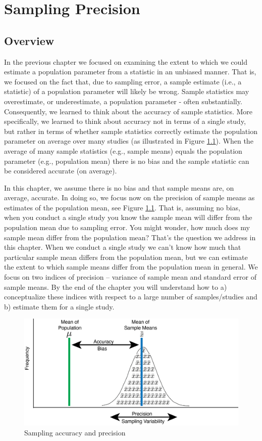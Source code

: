 \documentclass[
]{krantz}
\begin{document}
\hypertarget{sampling-precision}{%
\chapter{Sampling Precision}\label{sampling-precision}}

\hypertarget{overview-2}{%
\section{Overview}\label{overview-2}}

In the previous chapter we focused on examining the extent to which we could estimate a population parameter from a statistic in an unbiased manner. That is, we focused on the fact that, due to sampling error, a sample estimate (i.e., a statistic) of a population parameter will likely be wrong. Sample statistics may overestimate, or underestimate, a population parameter - often substantially. Consequently, we learned to think about the accuracy of sample statistics. More specifically, we learned to think about accuracy not in terms of a single study, but rather in terms of whether sample statistics correctly estimate the population parameter on average over many studies (as illustrated in Figure \ref{fig:showbias2}). When the average of many sample statistics (e.g., sample means) equals the population parameter (e.g., population mean) there is no bias and the sample statistic can be considered accurate (on average).

In this chapter, we assume there is no bias and that sample means are, on average, accurate. In doing so, we focus now on the precision of sample means as estimates of the population mean, see Figure \ref{fig:showbias2}. That is, assuming no bias, when you conduct a single study you know the sample mean will differ from the population mean due to sampling error. You might wonder, how much does my sample mean differ from the population mean? That's the question we address in this chapter. When we conduct a single study we can't know how much that particular sample mean differs from the population mean, but we can estimate the extent to which sample means differ from the population mean in general. We focus on two indices of precision -- variance of sample mean and standard error of sample means. By the end of the chapter you will understand how to a) conceptualize these indices with respect to a large number of samples/studies and b) estimate them for a single study.

\begin{figure}
\includegraphics[width=0.8\linewidth]{ch_samples_precision/images/sampling_accuracy} \caption{Sampling accuracy and precision}\label{fig:showbias2}
\end{figure}
\end{document}
